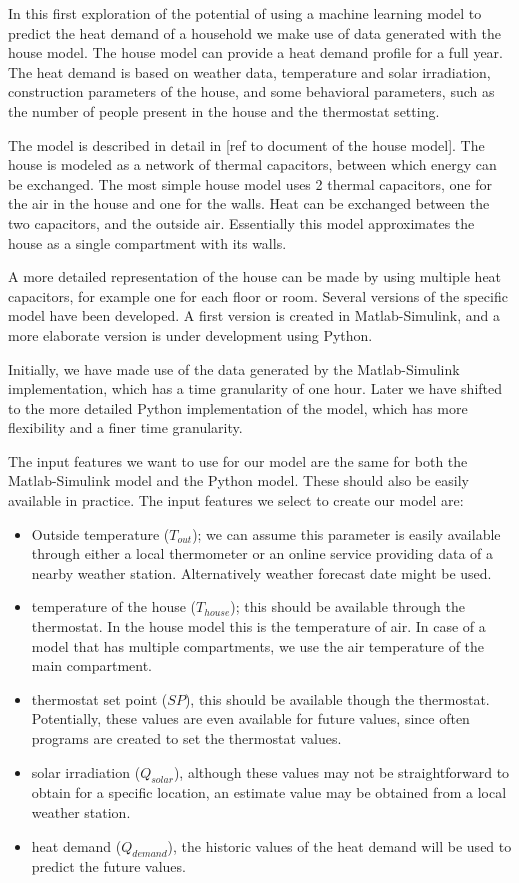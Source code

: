 In this first exploration of the potential of using a machine learning model to predict the heat demand of a household we make use of data generated with the house model. The house model can provide a heat demand profile for a full year. The heat demand is based on weather data, temperature and solar irradiation, construction parameters of the house, and some behavioral parameters, such as the number of people present in the house and the thermostat setting.   

The model is described in detail in [ref to document of the house model]. The house is modeled as a network of thermal capacitors, between which energy can be exchanged. The most simple house model uses 2 thermal capacitors, one for the air in the house and one for the walls. Heat can be exchanged between the two capacitors, and the outside air. Essentially this model approximates the house as a single compartment with its walls. 

A more detailed representation of the house can be made by using multiple heat capacitors, for example one for each floor or room.   
Several versions of the specific model have been developed. A first version is created in Matlab-Simulink, and a more elaborate version is under development using Python. 

Initially, we have made use of the data generated by the Matlab-Simulink implementation, which has a time granularity of one hour. Later we have shifted to the more detailed Python implementation of the model, which has more flexibility and a finer time granularity.

The input features we want to use for our model are the same for both the Matlab-Simulink model and the Python model. These should also be easily available in practice. The input features we select to create our model are:
\begin{itemize}
\item Outside temperature ($T_{out}$); we can assume this parameter is easily available through either a local thermometer or an online service providing data of a nearby weather station. Alternatively weather forecast date might be used. 
\item temperature of the house ($T_{house}$); this should be available through the thermostat. In the house model this is the temperature of air. In case of a model that has multiple compartments, we use the air temperature of the main compartment.
\item thermostat set point ($SP$), this should be available though the thermostat. Potentially, these values are even available for future values, since often programs are created to set the thermostat values. 
\item solar irradiation ($Q_{solar}$), although these values may not be straightforward to obtain for a specific location, an estimate value may be obtained from a local weather station. 
\item heat demand ($Q_{demand}$), the historic values of the heat demand will be used to predict the future values. 
\end{itemize}

